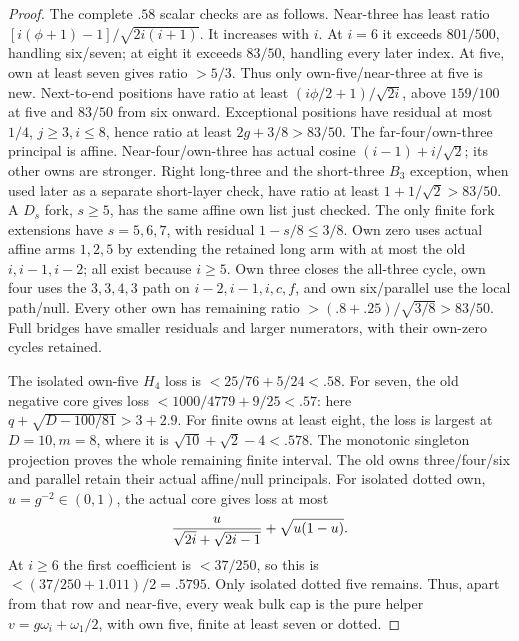 \begin{proof}
The complete $.58$ scalar checks are as follows. Near-three has
least ratio $[i(\phi+1)-1]/\sqrt{2i(i+1)}$. It increases with $i$.
At $i=6$ it exceeds $801/500$, handling six/seven; at eight it
exceeds $83/50$, handling every later index. At five, own at least
seven gives ratio $>5/3$. Thus only own-five/near-three at five is
new. Next-to-end positions have ratio at least
$(i\phi/2+1)/\sqrt{2i}$, above $159/100$ at five and $83/50$
from six onward. Exceptional positions have residual at most $1/4$,
$j\ge3,i\le8$, hence ratio at least $2g+3/8>83/50$.
The far-four/own-three principal is affine. Near-four/own-three
has actual cosine $(i-1)+i/\sqrt2$; its other owns are stronger.
Right long-three and the short-three $B_3$ exception, when used
later as a separate short-layer check, have ratio
at least $1+1/\sqrt2>83/50$. A $D_s$ fork, $s\ge5$, has the
same affine own list just checked. The only finite fork extensions
have $s=5,6,7$, with residual $1-s/8\le3/8$.
Own zero uses actual affine arms $1,2,5$ by extending the retained
long arm with at most the old $i,i-1,i-2$; all exist because $i\ge5$.
Own three closes the all-three cycle, own four uses the
$3,3,4,3$ path on $i-2,i-1,i,c,f$, and own six/parallel use
the local path/null. Every other own has remaining ratio
$>(.8+.25)/\sqrt{3/8}>83/50$. Full bridges have smaller residuals
and larger numerators, with their own-zero cycles retained.

The isolated own-five $H_4$ loss is $<25/76+5/24<.58$.
For seven, the old negative core gives loss
$<1000/4779+9/25<.57$: here $q+\sqrt{D-100/81}>3+2.9$.
For finite owns at least eight, the loss is largest at $D=10,m=8$,
where it is $\sqrt{10}+\sqrt2-4<.578$. The monotonic singleton
projection proves the whole remaining finite interval. The old
owns three/four/six and parallel retain their actual affine/null
principals. For isolated dotted own, $u=g^{-2}\in(0,1)$, the
actual core gives loss at most
\[
 {u\over\sqrt{2i}+\sqrt{2i-1}}+\sqrt{u(1-u)}.
\]
At $i\ge6$ the first coefficient is $<37/250$, so this is
$<(37/250+1.011)/2=.5795$. Only isolated dotted five remains.
Thus, apart from that row and near-five, every weak bulk cap is
the pure helper $v=g\omega_i+\omega_1/2$, with own five, finite
at least seven or dotted.


\end{proof}
